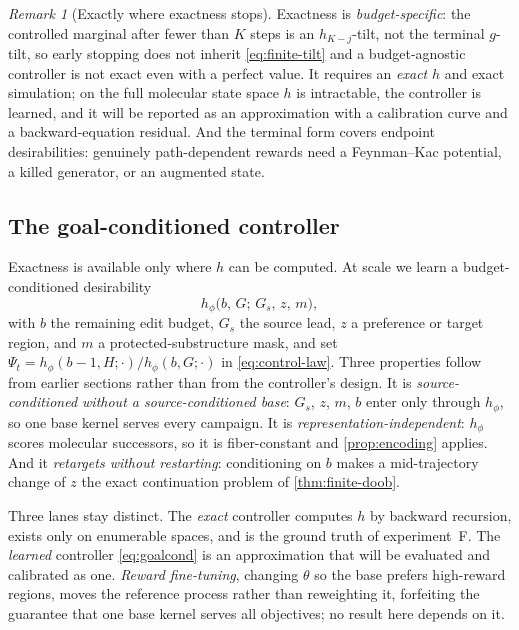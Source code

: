 \documentclass{article}
\theoremstyle{definition}
\theoremstyle{remark}
\newtheorem{remark}[theorem]{Remark}
\begin{document}
\begin{remark}[Exactly where exactness stops]\label{rem:exact-scope}
Exactness is \emph{budget-specific}: the controlled marginal after fewer than $K$ steps is an $h_{K-j}$-tilt, not the terminal $g$-tilt, so early stopping does not inherit \eqref{eq:finite-tilt} and a budget-agnostic controller is not exact even with a perfect value. It requires an \emph{exact} $h$ and exact simulation; on the full molecular state space $h$ is intractable, the controller is learned, and it will be reported as an approximation with a calibration curve and a backward-equation residual. And the terminal form covers endpoint desirabilities: genuinely path-dependent rewards need a Feynman--Kac potential, a killed generator, or an augmented state.
\end{remark}

\subsection{The goal-conditioned controller}
\label{sec:goalcond}

Exactness is available only where $h$ can be computed. At scale we learn a budget-conditioned desirability
\begin{equation}
h_\phi\big(b,\,G;\,G_s,\,z,\,m\big),
\label{eq:goalcond}
\end{equation}
with $b$ the remaining edit budget, $G_s$ the source lead, $z$ a preference or target region, and $m$ a protected-substructure mask, and set $\Psi_t=h_\phi(b-1,H;\cdot)/h_\phi(b,G;\cdot)$ in \eqref{eq:control-law}. Three properties follow from earlier sections rather than from the controller's design. It is \emph{source-conditioned without a source-conditioned base}: $G_s$, $z$, $m$, $b$ enter only through $h_\phi$, so one base kernel serves every campaign. It is \emph{representation-independent}: $h_\phi$ scores molecular successors, so it is fiber-constant and \cref{prop:encoding} applies. And it \emph{retargets without restarting}: conditioning on $b$ makes a mid-trajectory change of $z$ the exact continuation problem of \cref{thm:finite-doob}.

Three lanes stay distinct. The \emph{exact} controller computes $h$ by backward recursion, exists only on enumerable spaces, and is the ground truth of experiment~F. The \emph{learned} controller \eqref{eq:goalcond} is an approximation that will be evaluated and calibrated as one. \emph{Reward fine-tuning}, changing $\theta$ so the base prefers high-reward regions, moves the reference process rather than reweighting it, forfeiting the guarantee that one base kernel serves all objectives; no result here depends on it.
\end{document}
